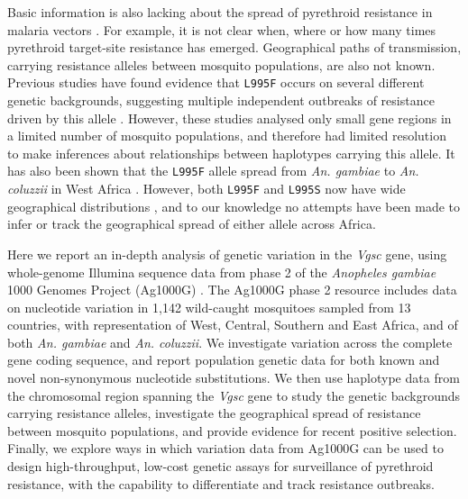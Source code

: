 \documentclass[a4paper,11pt,abstracton,hidelinks]{scrartcl}
\begin{document}
Basic information is also lacking about the spread of pyrethroid resistance in malaria vectors \cite{WorldHealthOrganization2012}.
%
For example, it is not clear when, where or how many times pyrethroid target-site resistance has emerged.
%
Geographical paths of transmission, carrying resistance alleles between mosquito populations, are also not known.
%
Previous studies have found evidence that \texttt{L995F} occurs on several different genetic backgrounds, suggesting multiple independent outbreaks of resistance driven by this allele \cite{Pinto2007,Etang2009,Lynd2010,Santolamazza2015}.
%
However, these studies analysed only small gene regions in a limited number of mosquito populations, and therefore had limited resolution to make inferences about relationships between haplotypes carrying this allele.
%
It has also been shown that the \texttt{L995F} allele spread from \textit{An. gambiae} to \textit{An. coluzzii} in West Africa \cite{weill2000,diabate2004,Clarkson2014,Norris2015}.
%
However, both \texttt{L995F} and \texttt{L995S} now have wide geographical distributions \cite{Silva2014}, and to our knowledge no attempts have been made to infer or track the geographical spread of either allele across Africa.

Here we report an in-depth analysis of genetic variation in the \textit{Vgsc} gene, using whole-genome Illumina sequence data from phase 2 of the \emph{Anopheles gambiae} 1000 Genomes Project (Ag1000G) \cite{clarkson2019genome}.
%
The Ag1000G phase 2 resource includes data on nucleotide variation in 1,142 wild-caught mosquitoes sampled from 13 countries, with representation of West, Central, Southern and East Africa, and of both \textit{An. gambiae} and \textit{An. coluzzii}.
%
We investigate variation across the complete gene coding sequence, and report population genetic data for both known and novel non-synonymous nucleotide substitutions.
%
We then use haplotype data from the chromosomal region spanning the \textit{Vgsc} gene to study the genetic backgrounds carrying resistance alleles, investigate the geographical spread of resistance between mosquito populations, and provide evidence for recent positive selection.
%
Finally, we explore ways in which variation data from Ag1000G can be used to design high-throughput, low-cost genetic assays for surveillance of pyrethroid resistance, with the capability to differentiate and track resistance outbreaks.


\end{document}
